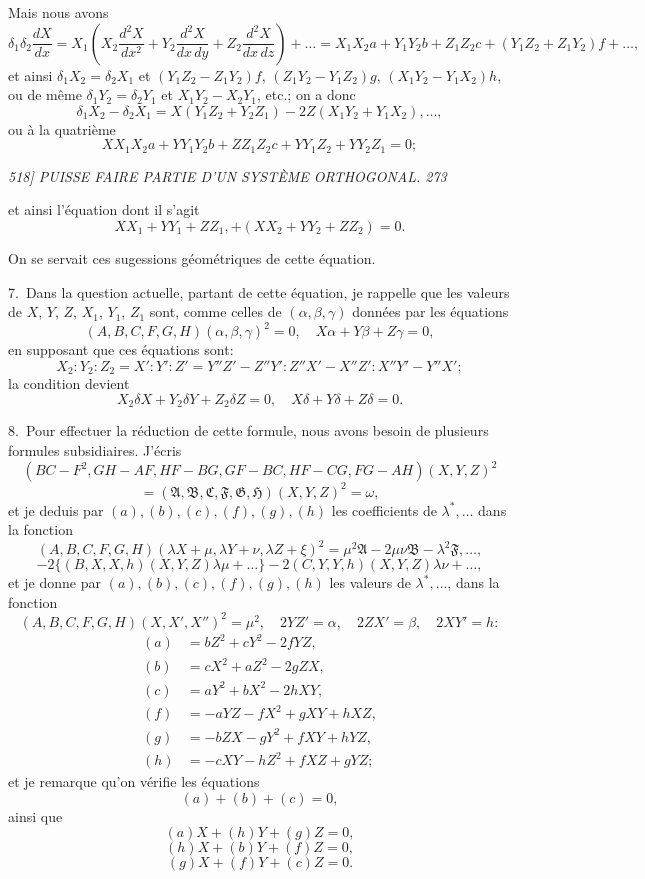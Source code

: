 \documentclass[11pt,a4paper]{book}
\begin{document}
Mais nous avons
\[
\delta_1 \delta_2 \frac{dX}{dx} = X_1\left(X_2 \frac{d^2 X}{dx^2} + Y_2 \frac{d^2 X}{dx\,dy} + Z_2 \frac{d^2 X}{dx\,dz}\right) + \ldots = X_1 X_2 a + Y_1 Y_2 b + Z_1 Z_2 c + (Y_1 Z_2 + Z_1 Y_2) f + \ldots,
\]
et ainsi $\delta_1 X_2 = \delta_2 X_1$ et $(Y_1 Z_2 - Z_1 Y_2) f$, $(Z_1 Y_2 - Y_1 Z_2) g$, $(X_1 Y_2 - Y_1 X_2) h$, ou de m\^eme
$\delta_1 Y_2 = \delta_2 Y_1$ et $X_1 Y_2 - X_2 Y_1$, etc.; on a donc
\[
\delta_1 X_2 - \delta_2 X_1 = X(Y_1 Z_2 + Y_2 Z_1) - 2 Z(X_1 Y_2 + Y_1 X_2), \ldots,
\]
ou \`a la quatri\`eme
\[
X X_1 X_2 a + Y Y_1 Y_2 b + Z Z_1 Z_2 c + Y Y_1 Z_2 + Y Y_2 Z_1 = 0;
\]

\clearpage

\noindent\textit{518] \hfill PUISSE FAIRE PARTIE D'UN SYST\`EME ORTHOGONAL. \hfill 273}

\medskip

et ainsi l'\'equation dont il s'agit
\[
X X_1 + Y Y_1 + Z Z_1, +(X X_2 + Y Y_2 + Z Z_2) = 0.
\]

On se servait ces sugessions g\'eom\'etriques de cette \'equation.

7.~Dans la question actuelle, partant de cette \'equation, je rappelle que les valeurs
de $X$, $Y$, $Z$, $X_1$, $Y_1$, $Z_1$ sont, comme celles de $(\alpha, \beta, \gamma)$ donn\'ees par les \'equations
\[
(A, B, C, F, G, H)(\alpha, \beta, \gamma)^2 = 0, \quad X\alpha + Y\beta + Z\gamma = 0,
\]
en supposant que ces \'equations sont:
\[
X_2 : Y_2 : Z_2 = X' : Y' : Z' = Y'' Z' - Z'' Y' : Z'' X' - X'' Z' : X'' Y' - Y'' X';
\]
la condition devient
\[
X_2 \delta X + Y_2 \delta Y + Z_2 \delta Z = 0, \quad X\delta + Y\delta + Z\delta = 0.
\]

8.~Pour effectuer la r\'eduction de cette formule, nous avons besoin de plusieurs
formules subsidiaires. J'\'ecris
\[
(BC - F^2, GH - AF, HF - BG, GF - BC, HF - CG, FG - AH)(X, Y, Z)^2
\]
\[
= (\mathfrak{A}, \mathfrak{B}, \mathfrak{C}, \mathfrak{F}, \mathfrak{G}, \mathfrak{H})(X, Y, Z)^2 = \omega,
\]
et je deduis par $(a), (b), (c), (f), (g), (h)$ les coefficients de $\lambda^*, \ldots$ dans la fonction
\[
(A, B, C, F, G, H)(\lambda X + \mu, \lambda Y + \nu, \lambda Z + \xi)^2 = \mu^2 \mathfrak{A} - 2\mu\nu\mathfrak{B} - \lambda^2 \mathfrak{F}, \ldots,
\]
\[
- 2\{(B, X, X, h)(X, Y, Z)\lambda\mu + \ldots\} - 2(C, Y, Y, h)(X, Y, Z)\lambda\nu + \ldots,
\]
et je donne par $(a), (b), (c), (f), (g), (h)$ les valeurs de $\lambda^*, \ldots$, dans la fonction
\[
(A, B, C, F, G, H)(X, X', X'')^2 = \mu^2, \quad 2YZ' = \alpha, \quad 2ZX' = \beta, \quad 2XY' = h:
\]
\begin{align*}
(a) &= b Z^2 + c Y^2 - 2fY Z, \\
(b) &= c X^2 + a Z^2 - 2gZX, \\
(c) &= a Y^2 + b X^2 - 2hX Y, \\
(f) &= - aYZ - fX^2 + gXY + hXZ, \\
(g) &= - bZX - gY^2 + fXY + hYZ, \\
(h) &= - cXY - hZ^2 + fXZ + gYZ;
\end{align*}
et je remarque qu'on v\'erifie les \'equations
\[
(a) + (b) + (c) = 0,
\]
ainsi que
\[
(a)X + (h)Y + (g)Z = 0,
\]
\[
(h)X + (b)Y + (f)Z = 0,
\]
\[
(g)X + (f)Y + (c)Z = 0.
\]
\end{document}
